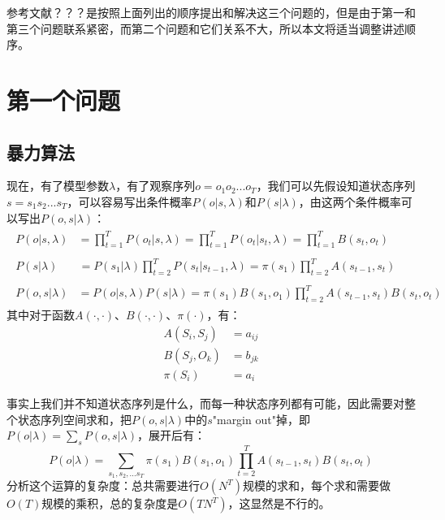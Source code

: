 \documentclass[11pt,a4paper]{article}
\numberwithin{equation}{section}
\begin{document}
参考文献？？？是按照上面列出的顺序提出和解决这三个问题的，但是由于第一和第三个问题联系紧密，而第二个问题和它们关系不大，所以本文将适当调整讲述顺序。

\section{第一个问题}

\subsection{暴力算法}

现在，有了模型参数$ \lambda $，有了观察序列$ o = o_1 o_2 ... o_T $，我们可以先假设知道状态序列$ s = s_1 s_2 ... s_T $，可以容易写出条件概率$ P(o | s, \lambda) $和$ P(s | \lambda) $，由这两个条件概率可以写出$ P(o, s | \lambda) $：
\begin{align}
\begin{split}\label{P(o|s,lambda)}
P(o | s, \lambda) 
& = \prod_{t = 1}^T P(o_t | s, \lambda) = \prod_{t = 1}^T P(o_t | s_t, \lambda) = \prod_{t = 1}^T B(s_t, o_t)
\end{split}
\\
\begin{split}\label{P(s|lambda)}
P(s | \lambda) \quad
& = P(s_1 | \lambda) \prod_{t = 2}^T P(s_t | s_{t - 1}, \lambda) = \pi(s_1) \prod_{t = 2}^T A(s_{t - 1}, s_t)
\end{split}
\\
\begin{split}\label{P(o,s|lambda)}
P(o, s | \lambda)
& = P(o | s, \lambda) P(s | \lambda) = \pi(s_1) B(s_1, o_1) \prod_{t = 2}^T A(s_{t - 1}, s_t) B(s_t, o_t)
\end{split}
\end{align}
其中对于函数$ A(\cdot, \cdot) $、$ B(\cdot, \cdot) $、$ \pi(\cdot) $，有：
\begin{subequations}
\begin{align}
A(S_i, S_j) & = a_{ij}\\
B(S_j, O_k) & = b_{jk}\\
\pi(S_i) & = a_{i}
\end{align}
\end{subequations}

事实上我们并不知道状态序列是什么，而每一种状态序列都有可能，因此需要对整个状态序列空间求和，把$ P(o, s | \lambda) $中的$ s $"margin out"掉，即$ P(o | \lambda) = \sum_s P(o, s| \lambda) $，展开后有：
\begin{equation}\label{P(o|lambda)}
P(o | \lambda) = \sum_{s_1, s_2, ... s_T} \pi(s_1) B(s_1, o_1) \prod_{t = 2}^T A(s_{t - 1}, s_t) B(s_t, o_t)
\end{equation}
分析这个运算的复杂度：总共需要进行$O(N^T)$规模的求和，每个求和需要做$ O(T) $规模的乘积，总的复杂度是$ O(TN^T) $，这显然是不行的。
\end{document}
